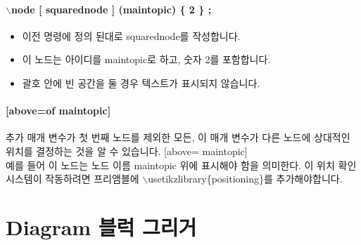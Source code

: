 		\paragraph{ $\backslash$node   [ squarednode ] (maintopic) \{ 2 \} ; }

			\begin{itemize}
			\setlength\itemsep{0.0em}
			\item 이전 명령에 정의 된대로 squarednode를 작성합니다. 
			\item 이 노드는 아이디를 maintopic로 하고, 숫자 2를 포함합니다. 
			\item 괄호 안에 빈 공간을 둘 경우 텍스트가 표시되지 않습니다. 
			 \end{itemize}
			 
		\paragraph{[above=of maintopic]}

			추가 매개 변수가 
			첫 번째 노드를 제외한 모든,
			이 매개 변수가 다른 노드에 상대적인 위치를 결정하는 것을 알 수 있습니다. 
			[above= maintopic] \\
			
			예를 들어 이 노드는 노드 이름 maintopic 위에 표시해야 함을 의미한다. 
			이 위치 확인 시스템이 작동하려면 프리앰블에 $\backslash$usetikzlibrary\{positioning\}를 
			추가해야합니다.



	\newpage
	\section{Diagram 블럭 그리거}

		    	
		    	
